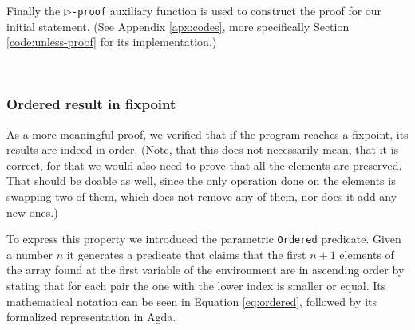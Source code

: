 Finally the \texttt{$\rhd$-proof} auxiliary function is used to construct the proof for our initial statement. (See Appendix \ref{apx:codes}, more specifically Section \ref{code:unless-proof} for its implementation.)

\begin{code}
    \>[0]\AgdaSpace{}%
    \AgdaSymbol{:}\AgdaSpace{}%
    \AgdaSymbol{(}\AgdaSpace{}%
    \AgdaSymbol{:}\AgdaSpace{}%
    \AgdaSymbol{)}\AgdaSpace{}%
    \AgdaSpace{}%
    \AgdaSpace{}%
    \AgdaOperator{\AgdaFunction{▷[}}\AgdaSpace{}%
    \AgdaSpace{}%
    \AgdaSpace{}%
    \AgdaOperator{\AgdaFunction{]}}\AgdaSpace{}%
    \<%
    \\
    \>[0]\AgdaSpace{}%
    \AgdaSpace{}%
    \AgdaSymbol{\{}\AgdaSymbol{\}}\AgdaSpace{}%
    \AgdaSymbol{=}\AgdaSpace{}%
    \AgdaSpace{}%
    \AgdaSymbol{\{}\AgdaSymbol{\}}\AgdaSpace{}%
    \AgdaSymbol{\{}\AgdaSymbol{\}}\AgdaSpace{}%
    \AgdaSymbol{(}\AgdaSpace{}%
    \AgdaSymbol{)}\<%
\end{code}


\subsubsection{Ordered result in fixpoint}

As a more meaningful proof, we verified that if the program reaches a fixpoint, its results are indeed in order. (Note, that this does not necessarily mean, that it is correct, for that we would also need to prove that all the elements are preserved. That should be doable as well, since the only operation done on the elements is swapping two of them, which does not remove any of them, nor does it add any new ones.)

To express this property we introduced the parametric \verb|Ordered| predicate. Given a number $n$ it generates a predicate that claims that the first $n + 1$ elements of the array found at the first variable of the environment are in ascending order by stating that for each pair the one with the lower index is smaller or equal. Its mathematical notation can be seen in Equation \ref{eq:ordered}, followed by its formalized representation in Agda.

